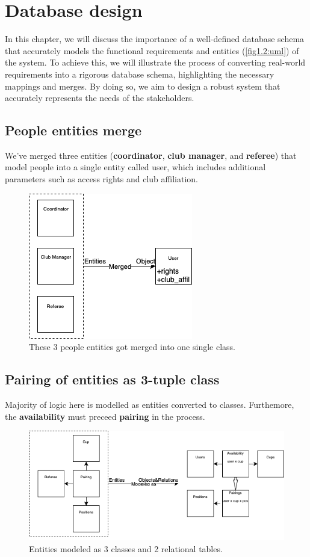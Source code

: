 \section{Database design}
In this chapter, we will discuss the importance of a well-defined database schema that accurately models the functional requirements and entities (\autoref{fig1.2:uml}) of the system. To achieve this, we will illustrate the process of converting real-world requirements into a rigorous database schema, highlighting the necessary mappings and merges. By doing so, we aim to design a robust system that accurately represents the needs of the stakeholders.
\subsection*{People entities merge}
We've merged three entities (\textbf{coordinator}, \textbf{club manager}, and \textbf{referee}) that model people into a single entity called user, which includes additional parameters such as access rights and club affiliation.
\begin{figure}[h]	
	\centering	
    \includegraphics[scale=0.5]{img/entities_to_user.png}
	\caption{These 3 people entities got merged into one single class.}
	\label{fig2.6:enttousr}
\end{figure}
\subsection*{Pairing of entities as 3-tuple class}
Majority of logic here is modelled as entities converted to classes. Furthemore, the \textbf{availability} must preceed \textbf{pairing} in the process.
\begin{figure}[h]	
	\centering	
    \includegraphics[scale=0.5]{img/entities_pairing_to_obj_rels.png}
	\caption{Entities modeled as 3 classes and 2 relational tables.}
	\label{fig2.7:entrels}
\end{figure}
